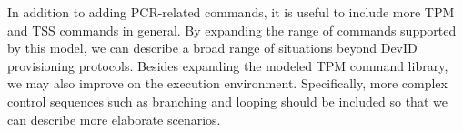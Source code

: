 \documentclass[runningheads]{llncs}
\begin{document}
In addition to adding PCR-related commands, it is useful to include
more TPM and TSS commands in general. By expanding the range of
commands supported by this model, we can describe a broad range of
situations beyond DevID provisioning protocols.
Besides expanding the modeled TPM command library, we may also improve
on the execution environment. Specifically, more complex control
sequences such as branching and looping should be included so that we
can describe more elaborate scenarios.
%
%
%

\end{document}
